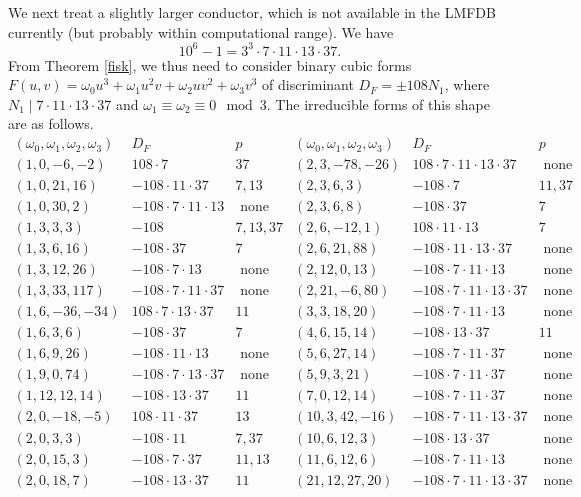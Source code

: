 We next treat a slightly larger conductor, which is not available in the LMFDB currently (but probably within computational range).
We have 
$$
10^6-1 = 3^3 \cdot 7 \cdot 11 \cdot 13 \cdot 37.
$$
From Theorem \ref{fisk}, we thus need to consider binary cubic forms $F(u,v) =  \omega_0 u^3 + \omega_1 u^2v + \omega_2 uv^2 + \omega_3 v^3$ of discriminant $D_F = \pm 108 N_1$, where $N_1 \mid 7 \cdot 11 \cdot 13 \cdot 37$ and $\omega_1 \equiv \omega_2 \equiv 0 \mod{3}$. The irreducible forms of this shape are as follows.
$$
\begin{array}{ccc|ccc} 
(\omega_0,\omega_1,\omega_2,\omega_3) & D_F & p & (\omega_0,\omega_1,\omega_2,\omega_3)  & D_F & p \\ \hline
(1,0,-6,-2) & 108 \cdot 7 & 37 &   (2,3,-78,-26) & 108 \cdot 7 \cdot 11 \cdot 13 \cdot 37 & \mbox{ none } \\
(1,0,21,16) & -108 \cdot 11 \cdot 37 & 7, 13 &  (2,3,6,3) & -108 \cdot 7 & 11, 37 \\
(1,0,30,2) & -108 \cdot 7 \cdot 11 \cdot 13 & \mbox{ none } &  
(2,3,6,8) & -108 \cdot 37 & 7 \\
(1, 3, 3, 3) & -108 & 7, 13, 37 &   (2, 6, -12, 1) & 108 \cdot 11 \cdot 13 & 7 \\
(1, 3, 6, 16) & -108 \cdot 37 & 7 &  (2,6,21,88) & -108 \cdot 11 \cdot 13 \cdot 37 &  \mbox{ none } \\
(1,3,12,26) & -108 \cdot 7 \cdot 13 & \mbox{ none } &  (2,12,0,13) & -108 \cdot 7 \cdot 11 \cdot 13 &  \mbox{ none } \\
(1,3,33,117) & -108 \cdot 7 \cdot 11 \cdot 37 & \mbox{ none } & (2,21,-6,80) &  -108 \cdot 7 \cdot 11 \cdot 13 \cdot 37 &  \mbox{ none }  \\ 
(1,6,-36,-34) & 108 \cdot 7 \cdot 13 \cdot 37 & 11 & (3,3,18,20) &  -108 \cdot 7 \cdot 11 \cdot 13 &  \mbox{ none } \\
(1,6,3,6) & -108 \cdot 37 & 7 &  (4,6,15,14) & -108 \cdot 13 \cdot  37 & 11 \\
(1,6,9,26) & -108 \cdot 11 \cdot 13 & \mbox{ none } & (5,6,27,14) & -108 \cdot 7 \cdot 11 \cdot 37 &  \mbox{ none } \\
(1,9,0,74) & -108 \cdot 7 \cdot 13 \cdot 37 & \mbox{ none } & (5,9,3,21) & -108 \cdot 7 \cdot 11 \cdot 37 &  \mbox{ none } \\
(1,12,12,14) & -108 \cdot 13 \cdot 37 & 11 &  (7,0,12,14) &  -108 \cdot 7 \cdot 11 \cdot 37 &  \mbox{ none }  \\
(2, 0, -18, -5) & 108 \cdot 11 \cdot 37 & 13 & (10,3,42,-16) & -108 \cdot 7 \cdot 11 \cdot 13 \cdot 37 &  \mbox{ none }  \\
(2,0,3,3) & -108 \cdot 11 & 7, 37 & (10,6,12,3) & -108 \cdot 13 \cdot  37 &  \mbox{ none }  \\
(2,0,15,3) & -108 \cdot 7 \cdot 37 & 11, 13 & (11,6,12,6) & -108 \cdot 7 \cdot 11 \cdot 13  &  \mbox{ none } \\
(2,0,18,7) & -108 \cdot 13 \cdot 37 & 11 & (21,12,27,20) &  -108 \cdot 7 \cdot 11 \cdot 13 \cdot 37 &  \mbox{ none }  \\
\end{array}
$$
